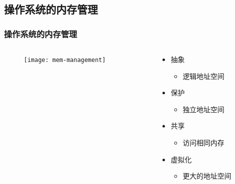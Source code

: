 \subsection{操作系统的内存管理} %

\begin{frame}[plain,t]
    
    \frametitle{操作系统的内存管理}
    \begin{columns}
        \begin{column}{0.7\textwidth}
		    \begin{figure}
		        \centering
		        \texttt{[image: mem-management]}
		    \end{figure}
        \end{column}
        \begin{column}{0.3\textwidth}
		\begin{itemize}
		    \item 抽象
			
		    \begin{itemize}
		        \item 逻辑地址空间
		    \end{itemize}
		    \item 保护
			
		    \begin{itemize}
		        \item 独立地址空间
		    \end{itemize}
		    \item 共享
			
		    \begin{itemize}
		        \item 访问相同内存
		    \end{itemize}
		    \item 虚拟化
			
		    \begin{itemize}
		        \item 更大的地址空间
		    \end{itemize}
		\end{itemize}
        \end{column}
    \end{columns}
\end{frame}

